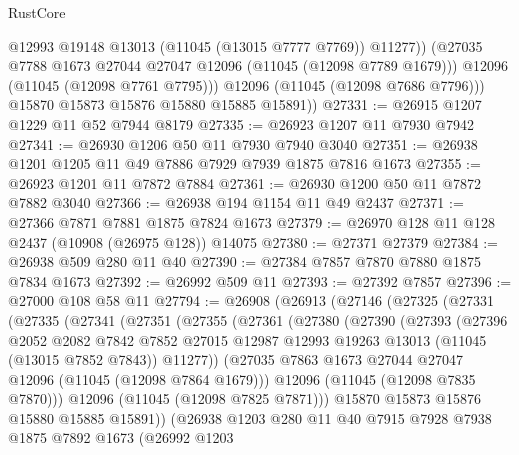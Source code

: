 \begin{lexlean}{RustCore}
\begin{coremodule}
                @12993
                @19148
                @13013
                (@11045 (@13015 @7777 @7769))
                @11277))
            (@27035 @7788 @1673 @27044 @27047 @12096 (@11045 (@12098 @7789 @1679)))
            @12096
            (@11045 (@12098 @7761 @7795)))
          @12096
          (@11045 (@12098 @7686 @7796)))
        @15870
        @15873
        @15876
        @15880
        @15885
        @15891))
@27331 := @26915 @1207 @1229 @11 @52 @7944 @8179
@27335 := @26923 @1207 @11 @7930 @7942
@27341 := @26930 @1206 @50 @11 @7930 @7940 @3040
@27351 := @26938 @1201 @1205 @11 @49 @7886 @7929 @7939 @1875 @7816 @1673
@27355 := @26923 @1201 @11 @7872 @7884
@27361 := @26930 @1200 @50 @11 @7872 @7882 @3040
@27366 := @26938 @194 @1154 @11 @49 @2437
@27371 := @27366 @7871 @7881 @1875 @7824 @1673
@27379 := @26970 @128 @11 @128 @2437 (@10908 (@26975 @128)) @14075
@27380 := @27371 @27379
@27384 := @26938 @509 @280 @11 @40
@27390 := @27384 @7857 @7870 @7880 @1875 @7834 @1673
@27392 := @26992 @509 @11
@27393 := @27392 @7857
@27396 := @27000 @108 @58 @11
@27794 := @26908
    (@26913
      (@27146
        (@27325
          (@27331
            (@27335
              (@27341
                (@27351
                  (@27355
                    (@27361
                      (@27380
                        (@27390
                          (@27393
                            (@27396
                              @2052
                              @2082
                              @7842
                              @7852
                              @27015
                              @12987
                              @12993
                              @19263
                              @13013
                              (@11045 (@13015 @7852 @7843))
                              @11277))
                          (@27035 @7863 @1673 @27044 @27047 @12096 (@11045 (@12098 @7864 @1679)))
                          @12096
                          (@11045 (@12098 @7835 @7870)))
                        @12096
                        (@11045 (@12098 @7825 @7871)))
                      @15870
                      @15873
                      @15876
                      @15880
                      @15885
                      @15891))
                  (@26938
                    @1203
                    @280
                    @11
                    @40
                    @7915
                    @7928
                    @7938
                    @1875
                    @7892
                    @1673
                    (@26992
                      @1203

\end{coremodule}
\end{lexlean}
